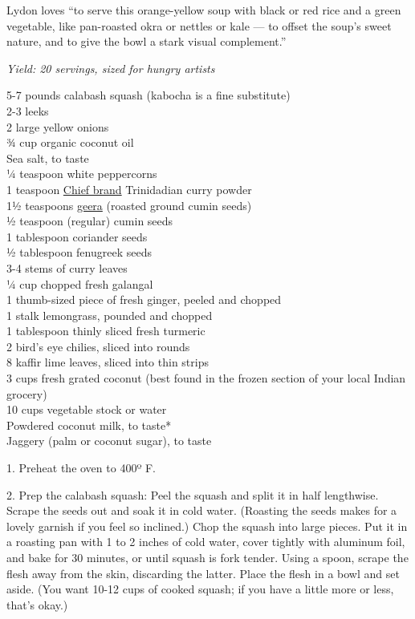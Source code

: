 Lydon loves ``to serve this orange-yellow soup with black or red rice
and a green vegetable, like pan-roasted okra or nettles or kale --- to
offset the soup's sweet nature, and to give the bowl a stark visual
complement.''

\emph{Yield: 20 servings, sized for hungry artists}

5-7 pounds calabash squash (kabocha is a fine substitute)\\
2-3 leeks\\
2 large yellow onions\\
¾ cup organic coconut oil\\
Sea salt, to taste\\
¼ teaspoon white peppercorns\\
1 teaspoon
\href{https://www.amazon.com/CHIEF-Indian-Head-Curry-Powder/dp/B003SDIWU6}{Chief
brand} Trinidadian curry powder\\
1½ teaspoons
\href{https://www.amazon.com/Chief-Roasted-Geera-3oz/dp/B000QTAH1M}{geera}
(roasted ground cumin seeds)\\
½ teaspoon (regular) cumin seeds\\
1 tablespoon coriander seeds\\
½ tablespoon fenugreek seeds\\
3-4 stems of curry leaves\\
¼ cup chopped fresh galangal\\
1 thumb-sized piece of fresh ginger, peeled and chopped\\
1 stalk lemongrass, pounded and chopped\\
1 tablespoon thinly sliced fresh turmeric\\
2 bird's eye chilies, sliced into rounds\\
8 kaffir lime leaves, sliced into thin strips\\
3 cups fresh grated coconut (best found in the frozen section of your
local Indian grocery)\\
10 cups vegetable stock or water\\
Powdered coconut milk, to taste*\\
Jaggery (palm or coconut sugar), to taste

1. Preheat the oven to 400º F.

2. Prep the calabash squash: Peel the squash and split it in half
lengthwise. Scrape the seeds out and soak it in cold water. (Roasting
the seeds makes for a lovely garnish if you feel so inclined.) Chop the
squash into large pieces. Put it in a roasting pan with 1 to 2 inches of
cold water, cover tightly with aluminum foil, and bake for 30 minutes,
or until squash is fork tender. Using a spoon, scrape the flesh away
from the skin, discarding the latter. Place the flesh in a bowl and set
aside. (You want 10-12 cups of cooked squash; if you have a little more
or less, that's okay.)

